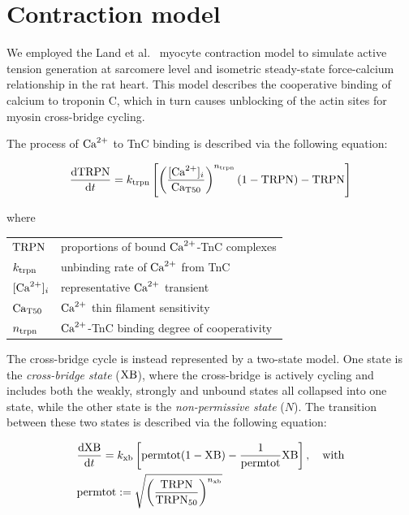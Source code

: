 

%
%
%
\section{Contraction model}\label{sec:contractionmodel}
We employed the Land et al.~\cite{Land:2012} myocyte contraction model to simulate active tension generation at sarcomere level and isometric steady-state force-calcium relationship in the rat heart. This model describes the cooperative binding of calcium to troponin C, which in turn causes unblocking of the actin sites for myosin cross-bridge cycling.

\vspace{0.2cm}
The process of $\textrm{Ca}^{2+}$ to TnC binding is described via the following equation:

\begin{equation}\label{eq:landodesys1}
    \dfrac{\mathrm{d}{\textrm{TRPN}}}{\mathrm{d}{t}} = k_{\textrm{trpn}}\left[\left(\frac{[\textrm{Ca}^{2+}]_{i}}{\textrm{Ca}_{\textrm{T}50}}\right)^{n_{\textrm{trpn}}}(1-\textrm{TRPN})-\textrm{TRPN}\right]
\end{equation}

\noindent
where

\vspace{0.2cm}
\begin{tabular}{ll}
    $\textrm{TRPN}$  & proportions of bound $\textrm{Ca}^{2+}$-TnC complexes \\
    $k_{\textrm{trpn}}$ & unbinding rate of $\textrm{Ca}^{2+}$ from TnC \\
    $[\textrm{Ca}^{2+}]_{i}$   & representative $\textrm{Ca}^{2+}$ transient \\
    $\textrm{Ca}_{\textrm{T}50}$ & $\textrm{Ca}^{2+}$ thin filament sensitivity \\
    $n_{\textrm{trpn}}$ & $\textrm{Ca}^{2+}$-TnC binding degree of cooperativity
\end{tabular}

\vspace{0.3cm}
The cross-bridge cycle is instead represented by a two-state model. One state is the \textit{cross-bridge state} ($\textrm{XB}$), where the cross-bridge is actively cycling and includes both the weakly, strongly and unbound states all collapsed into one state, while the other state is the \textit{non-permissive state} ($N$). The transition between these two states is described via the following equation:

\begin{align}\label{eq:landodesys2}
    & \dfrac{\mathrm{d}{\textrm{XB}}}{\mathrm{d}{t}} = k_{\textrm{xb}}\left[\textrm{permtot}(1-\textrm{XB})-\frac{1}{\textrm{permtot}}\textrm{XB}\right],\quad\text{with} \\
    & \textrm{permtot} := \sqrt{\left(\frac{\textrm{TRPN}}{\textrm{TRPN}_{50}}\right)^{n_{\textrm{xb}}}} \nonumber
\end{align}

